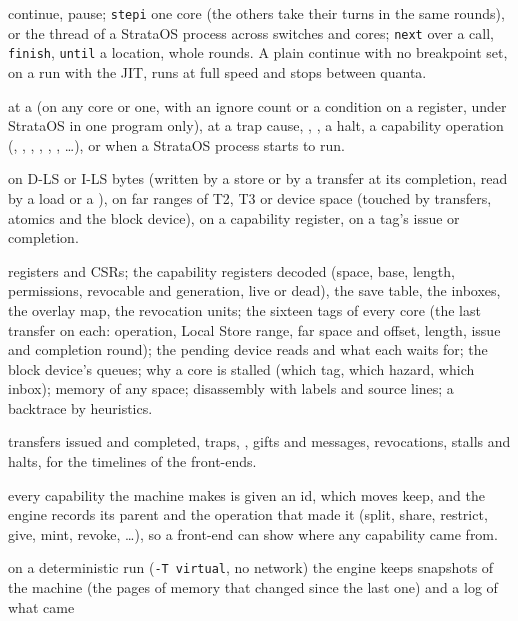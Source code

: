 \begin{description}[leftmargin=1em,style=nextline]
\item[Control] continue, pause; \texttt{stepi} one core (the others take their turns in the same
  rounds), or the thread of a StrataOS process across switches and cores; \texttt{next} over a call,
  \texttt{finish}, \texttt{until} a location, whole rounds. A plain continue with no breakpoint set,
  on a run with the JIT, runs at full speed and stops between quanta.
\item[Breakpoints] at a  (on any core or one, with an ignore count or a condition on a register,
  under StrataOS in one program only), at a trap cause, , , a halt, a capability
  operation (, , , , , ,
  \ldots), or when a StrataOS process starts to run.
\item[Watchpoints] on D-LS or I-LS bytes (written by a store or by a transfer at its completion, read by
  a load or a ), on far ranges of T2, T3 or device space (touched by transfers, atomics and
  the block device), on a capability register, on a tag's issue or completion.
\item[State] registers and CSRs; the capability registers decoded (space, base, length, permissions,
  revocable and generation, live or dead), the save table, the inboxes, the overlay map, the revocation
  units; the sixteen tags of every core (the last transfer on each: operation, Local Store range, far
  space and offset, length, issue and completion round); the pending device reads and what each waits
  for; the block device's queues; why a core is stalled (which tag, which hazard, which inbox); memory
  of any space; disassembly with labels and source lines; a backtrace by heuristics.
\item[Event log] transfers issued and completed, traps, , gifts and messages, revocations,
  stalls and halts, for the timelines of the front-ends.
\item[Provenance] every capability the machine makes is given an id, which moves keep, and the engine
  records its parent and the operation that made it (split, share, restrict, give, mint, revoke,
  \ldots), so a front-end can show where any capability came from.
\item[Time travel] on a deterministic run (\texttt{-T virtual}, no network) the engine keeps
  snapshots of the machine (the pages of memory that changed since the last one) and a log of what came

\end{description}
